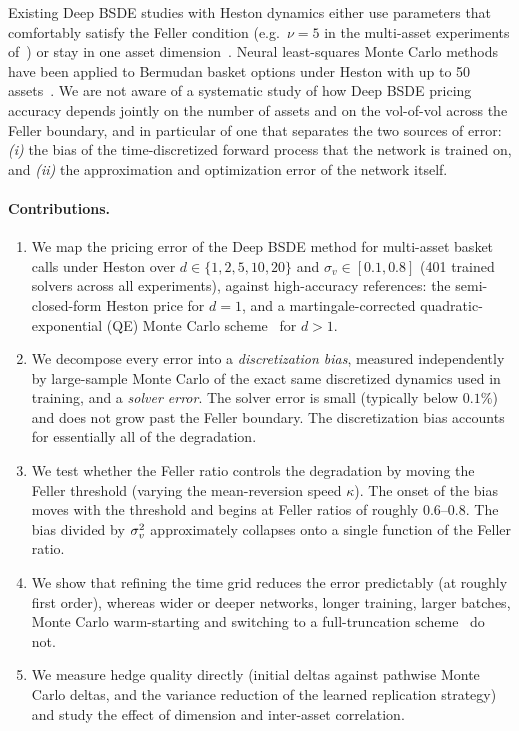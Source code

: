 Existing Deep BSDE studies with Heston dynamics either use parameters that comfortably satisfy the Feller condition (e.g.\ $\nu=5$ in the multi-asset experiments of~\cite{gnoatto2025deep}) or stay in one asset dimension~\cite{negyesi2026deep}. Neural least-squares Monte Carlo methods have been applied to Bermudan basket options under Heston with up to 50 assets~\cite{aaslund2025neural}. We are not aware of a systematic study of how Deep BSDE pricing accuracy depends jointly on the number of assets and on the vol-of-vol across the Feller boundary, and in particular of one that separates the two sources of error: \emph{(i)} the bias of the time-discretized forward process that the network is trained on, and \emph{(ii)} the approximation and optimization error of the network itself.

\paragraph{Contributions.}
\begin{enumerate}[leftmargin=*,itemsep=2pt]
  \item We map the pricing error of the Deep BSDE method for multi-asset basket calls under Heston over $d\in\{1,2,5,10,20\}$ and $\sigma_v\in[0.1,0.8]$ (401 trained solvers across all experiments), against high-accuracy references: the semi-closed-form Heston price for $d=1$, and a martingale-corrected quadratic-exponential (QE) Monte Carlo scheme~\cite{andersen2008simple} for $d>1$.
  \item We decompose every error into a \emph{discretization bias}, measured independently by large-sample Monte Carlo of the exact same discretized dynamics used in training, and a \emph{solver error}. The solver error is small (typically below $0.1\%$) and does not grow past the Feller boundary. The discretization bias accounts for essentially all of the degradation.
  \item We test whether the Feller ratio controls the degradation by moving the Feller threshold (varying the mean-reversion speed $\kappa$). The onset of the bias moves with the threshold and begins at Feller ratios of roughly $0.6$--$0.8$. The bias divided by $\sigma_v^2$ approximately collapses onto a single function of the Feller ratio.
  \item We show that refining the time grid reduces the error predictably (at roughly first order), whereas wider or deeper networks, longer training, larger batches, Monte Carlo warm-starting and switching to a full-truncation scheme~\cite{lord2010comparison} do not.
  \item We measure hedge quality directly (initial deltas against pathwise Monte Carlo deltas, and the variance reduction of the learned replication strategy) and study the effect of dimension and inter-asset correlation.
\end{enumerate}

